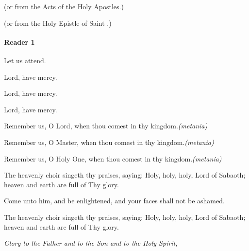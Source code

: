 \documentclass[twoside, letterpaper, 12pt]{report}
\begin{document}
  (or from the Acts of the Holy Apostles.)
  
  (or from the Holy Epistle of Saint \underline{\hspace{1cm}}.)

\paragraph{Reader 1} Let us attend.






\begin{reader}
\item Lord, have mercy. 
\item Lord, have mercy. 
\item Lord, have mercy. 
\end{reader}


\newcommand\metania{\emph{(metania)}}
Remember us, O Lord, when thou comest in thy kingdom.\metania

Remember us, O Master, when thou comest in thy kingdom.\metania

Remember us, O Holy One, when thou comest in thy kingdom.\metania

The heavenly choir singeth thy praises, saying: Holy, holy, holy, Lord of Sabaoth; heaven and earth are full of Thy glory.

Come unto him, and be enlightened, and your faces shall not be ashamed.

The heavenly choir singeth thy praises, saying: Holy, holy, holy, Lord of Sabaoth; heaven and earth are full of Thy glory.

\emph{Glory to the Father and to the Son and to the Holy Spirit,}
\end{document}
